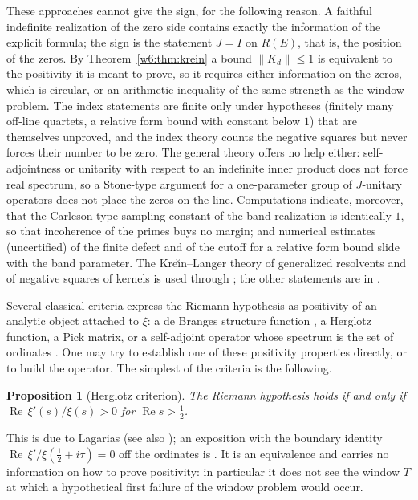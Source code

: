 \documentclass[11pt]{amsart}
\newtheorem{proposition}[theorem]{Proposition}
\theoremstyle{definition}
\theoremstyle{remark}
\numberwithin{equation}{section}
\DeclareMathOperator{\Rel}{Re}
\begin{document}
These approaches cannot give the sign, for the following reason. A faithful indefinite realization
of the zero side contains exactly the information of the explicit formula; the sign is the
statement $J=I$ on $R(E)$, that is, the position of the zeros. By Theorem~\ref{w6:thm:krein} a
bound $\|K_d\|\le1$ is equivalent to the positivity it is meant to prove, so it requires either
information on the zeros, which is circular, or an arithmetic inequality of the same strength as
the window problem. The index statements are finite only under hypotheses (finitely many off-line
quartets, a relative form bound with constant below $1$) that are themselves unproved, and the
index theory counts the negative squares but never forces their number to be zero. The general
theory offers no help either: self-adjointness or unitarity with respect to an indefinite inner
product does not force real spectrum, so a Stone-type argument for a one-parameter group of
$J$-unitary operators does not place the zeros on the line. Computations indicate, moreover, that
the Carleson-type sampling constant of the band realization is identically $1$, so that
incoherence of the primes buys no margin; and numerical estimates (uncertified) of the finite
defect and of the cutoff for a relative form bound slide with the band parameter. The Kre\u{\i}n--Langer
theory of generalized resolvents and of negative squares of kernels is used through
\cite{P35}; the other statements are in \cite{P08,P11,P18,P25}.

\label{w6:fam:R11}
Several classical criteria express the Riemann hypothesis as positivity of an analytic object
attached to $\xi$: a de Branges structure function \cite{deBranges1968}, a Herglotz function, a
Pick matrix, or a self-adjoint operator whose spectrum is the set of ordinates
\cite{BerryKeating1999,Connes1999}. One may try to establish one of these positivity properties
directly, or to build the operator. The simplest of the criteria is the following.

\begin{proposition}[Herglotz criterion]\label{w6:prop:herglotz}
The Riemann hypothesis holds if and only if $\Rel\,\xi'(s)/\xi(s)>0$ for $\Rel s>\frac12$.
\end{proposition}

This is due to Lagarias \cite{Lagarias1999} (see also \cite{Hinkkanen1997}); an exposition with the
boundary identity $\Rel\,\xi'/\xi(\frac12+i\tau)=0$ off the ordinates is \cite[Proposition~2.1 and
Theorem~3.1]{P20}. It is an equivalence and carries no information on how to prove positivity: in
particular it does not see the window $T$ at which a hypothetical first failure of the window
problem would occur.
\end{document}
